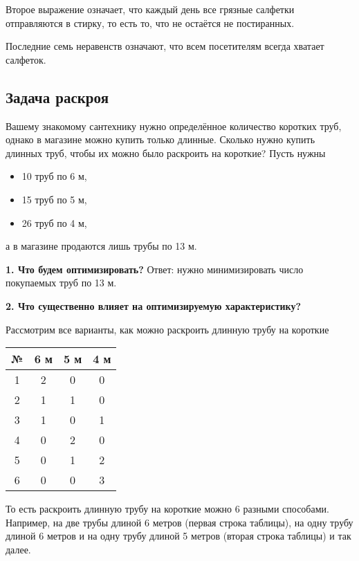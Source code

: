 Второе выражение означает, что каждый день все грязные салфетки отправляются в стирку, то есть то, что не остаётся не постиранных.

Последние семь неравенств означают, что всем посетителям всегда хватает салфеток.

\subsection{Задача раскроя}

\problem[раскроя]\label{pr:cutting_stock}

Вашему знакомому сантехнику нужно определённое количество коротких труб, однако в магазине можно купить только длинные. Сколько нужно купить длинных труб, чтобы их можно было раскроить на короткие? Пусть нужны
\begin{itemize}[nosep]
	\item 10 труб по 6 м,
	
	\item 15 труб по 5 м,
	
	\item 26 труб по 4 м,
\end{itemize}

а в магазине продаются лишь трубы по 13 м.

\bigskip

\textbf{1. Что будем оптимизировать?} Ответ: нужно минимизировать число покупаемых труб по 13 м.

\bigskip

\textbf{2. Что существенно влияет на оптимизируемую характеристику?}

Рассмотрим все варианты, как можно раскроить длинную трубу на короткие

\begin{table}[h!]
	\centering
	\begin{tabular}{| c | c | c | c | } 
		\hline
		№ & 6 м & 5 м & 4 м \\ 
		\hline
		1 & 2 & 0 & 0 \\\hline
		2 & 1 & 1 & 0 \\\hline
		3 & 1 & 0 & 1 \\\hline
		4 & 0 & 2 & 0 \\\hline
		5 & 0 & 1 & 2 \\\hline
		6 & 0 & 0 & 3 \\\hline
	\end{tabular}
\end{table}

То есть раскроить длинную трубу на короткие можно 6 разными способами. Например, на две трубы длиной 6 метров (первая строка таблицы), на одну трубу длиной 6 метров и на одну трубу длиной 5 метров (вторая строка таблицы) и так далее.

